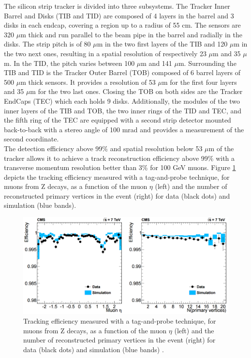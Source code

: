     The silicon strip tracker is divided into three subsystems. The Tracker Inner Barrel and Disks (TIB and TID) are composed of 4 layers in the barrel and 3 disks in each endcap, covering a region up to a radius of 55 cm. The sensors are 320 $\mu$m thick and run parallel to the beam pipe in the barrel and radially in the disks. The strip pitch is of 80 $\mu$m in the two first layers of the TIB and 120 $\mu$m in the two next ones, resulting in a spatial resolution of respectively 23 $\mu$m and 35 $\mu$m. In the TID, the pitch varies between 100 $\mu$m and 141 $\mu$m. Surrounding the TIB and TID is the Tracker Outer Barrel (TOB) composed of 6 barrel layers of 500 $\mu$m thick sensors. It provides a resolution of 53 $\mu$m for the first four layers and 35 $\mu$m for the two last ones. Closing the TOB on both sides are the Tracker EndCaps (TEC) which each holds 9 disks. Additionally, the modules of the two inner layers of the TIB and TOB, the two inner rings of the TID and TEC, and the fifth ring of the TEC are equipped with a second strip detector mounted back-to-back with a stereo angle of 100 mrad and provides a measurement of the second coordinate. \\

    The detection efficiency above 99\% and spatial resolution below 53 $\mu$m of the tracker allows it to achieve a track reconstruction efficiency above 99\%  with a transverse momentum resolution better than 3\% for 100 GeV muons. Figure \ref{fig:I-3-tracker-eff} depicts the tracking efficiency measured with a tag-and-probe technique, for muons from Z decays, as a function of the muon $\eta$ (left) and the number of reconstructed primary vertices in the event (right) for data (black dots) and simulation (blue bands). \\

    \begin{figure}[b!]
      \centering
      \includegraphics[width=\textwidth]{img/I-3-cms/tracker_efficiency.png}
      \caption{Tracking efficiency measured with a tag-and-probe technique, for muons from Z decays, as a function of the muon $\eta$ (left) and the number of reconstructed primary vertices in the event (right) for data (black dots) and simulation (blue bands) \cite{Chatrchyan:2014fea}.}
      \label{fig:I-3-tracker-eff}
    \end{figure}

